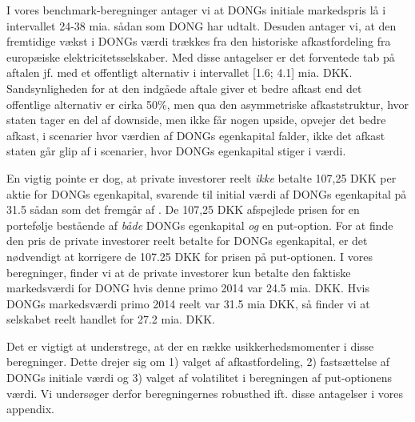 \documentclass{article}
\begin{document}
I vores benchmark-beregninger antager vi at DONGs initiale markedspris lå i intervallet 24-38 mia. sådan som DONG har udtalt. Desuden antager vi, at den fremtidige vækst i DONGs værdi trækkes fra den historiske afkastfordeling fra europæiske elektricitetsselskaber. Med disse antagelser er det forventede tab på aftalen jf. med et offentligt alternativ i intervallet [1.6; 4.1] mia. DKK. Sandsynligheden for at den indgåede aftale giver et bedre afkast end det offentlige alternativ er cirka 50\%, men qua den asymmetriske afkaststruktur, hvor staten tager en del af downside, men ikke får nogen upside, opvejer det bedre afkast, i scenarier hvor værdien af DONGs egenkapital falder, ikke det afkast staten går glip af i  scenarier, hvor DONGs egenkapital stiger i værdi.


En vigtig pointe er dog, at private investorer reelt \emph{ikke} betalte 107,25 DKK per aktie for DONGs egenkapital, svarende til initial værdi af DONGs egenkapital på 31.5 sådan som det fremgår af \cite{FM2013a}. De 107,25 DKK afspejlede prisen for en portefølje bestående af \emph{både} DONGs egenkapital \emph{og} en put-option. For at finde den pris de private investorer reelt betalte for DONGs egenkapital, er det nødvendigt at korrigere de 107.25 DKK for prisen på put-optionen. I vores beregninger, finder vi at de private investorer kun betalte den faktiske markedsværdi for DONG hvis denne primo 2014 var 24.5 mia. DKK. Hvis DONGs markedsværdi primo 2014 reelt var 31.5 mia DKK, så finder vi at selskabet reelt handlet for 27.2 mia. DKK.

Det er vigtigt at understrege, at der en række usikkerhedsmomenter i disse beregninger. Dette drejer sig om 1) valget af afkastfordeling, 2) fastsættelse af DONGs initiale værdi og 3) valget af volatilitet i beregningen af put-optionens værdi. Vi undersøger derfor beregningernes robusthed ift. disse antagelser i vores appendix.
\end{document}
